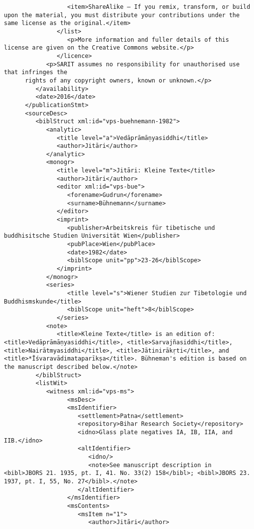 \documentclass[article,12pt,a4paper]{memoir}%
\begin{document}
\begin{verbatim}
                  <item>ShareAlike — If you remix, transform, or build upon the material, you must distribute your contributions under the same license as the original.</item>
               </list>
	              <p>More information and fuller details of this license are given on the Creative Commons website.</p>
	           </licence>
            <p>SARIT assumes no responsibility for unauthorised use that infringes the
	  rights of any copyright owners, known or unknown.</p>
         </availability>
         <date>2016</date>
      </publicationStmt>
      <sourceDesc>
         <biblStruct xml:id="vps-buehnemann-1982">
            <analytic>
               <title level="a">Vedāprāmāṇyasiddhi</title>
               <author>Jitāri</author>
            </analytic>
            <monogr>
               <title level="m">Jitāri: Kleine Texte</title>
               <author>Jitāri</author>
               <editor xml:id="vps-bue">
                  <forename>Gudrun</forename> 
                  <surname>Bühnemann</surname>
               </editor>
               <imprint>
                  <publisher>Arbeitskreis für tibetische und buddhisitsche Studien Universität Wien</publisher>
                  <pubPlace>Wien</pubPlace>
                  <date>1982</date>
                  <biblScope unit="pp">23-26</biblScope>
               </imprint>
            </monogr>
            <series>
	              <title level="s">Wiener Studien zur Tibetologie und Buddhismskunde</title>
	              <biblScope unit="heft">8</biblScope>
	           </series>
            <note>
               <title>Kleine Texte</title> is an edition of: <title>Vedāprāmāṇyasiddhi</title>, <title>Sarvajñasiddhi</title>, <title>Nairātmyasiddhi</title>, <title>Jātinirākṛti</title>, and <title>*Īśvaravādimataparīkṣa</title>. Bühneman's edition is based on the manuscript described below.</note>
         </biblStruct>
         <listWit>
            <witness xml:id="vps-ms">
	              <msDesc>
                  <msIdentifier>
                     <settlement>Patna</settlement>
                     <repository>Bihar Research Society</repository>
                     <idno>Glass plate negatives IA, IB, IIA, and  IIB.</idno>
                     <altIdentifier>
                        <idno/>
                        <note>See manuscript description in <bibl>JBORS 21. 1935, pt. I, 41. No. 33(2) 158</bibl>; <bibl>JBORS 23. 1937, pt. I, 55, No. 27</bibl>.</note>
                     </altIdentifier>
                  </msIdentifier>
                  <msContents>
                     <msItem n="1">
                        <author>Jitāri</author>

\end{verbatim}
\end{document}
